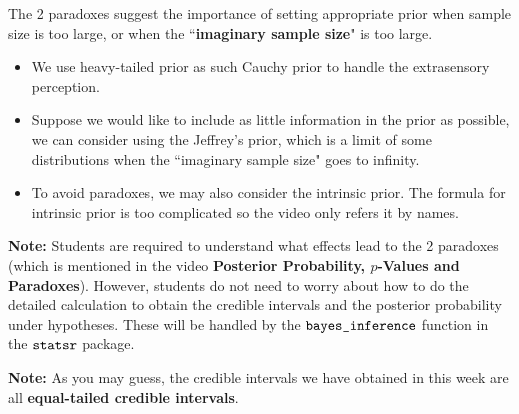 \documentclass{article}
\begin{document}
\begin{itemize}
		
	The 2 paradoxes suggest the importance of setting appropriate prior when sample size is too large, or when the ``\textbf{imaginary sample size}" is too large. 
	\begin{itemize}
		\item We use heavy-tailed prior as such Cauchy prior to handle the extrasensory perception.
		
		\item Suppose we would like to include as little information in the prior as possible, we can consider using the Jeffrey's prior, which is a limit of some distributions when the ``imaginary sample size" goes to infinity.
		
		\item To avoid paradoxes, we may also consider the intrinsic prior. The formula for intrinsic prior is too complicated so the video only refers it by names.
	\end{itemize}
	
	\textbf{Note: }Students are required to understand what effects lead to the 2 paradoxes (which is mentioned in the video \textbf{Posterior Probability, $p$-Values and Paradoxes}). However, students do not need to worry about how to do the detailed calculation to obtain the credible intervals and the posterior probability under hypotheses. These will be handled by the $\verb|bayes_inference|$ function in the $\verb|statsr|$ package.
	
	\textbf{Note: }As you may guess, the credible intervals we have obtained in this week are all \textbf{equal-tailed credible intervals}.\\
	
\end{itemize}
\end{document}
